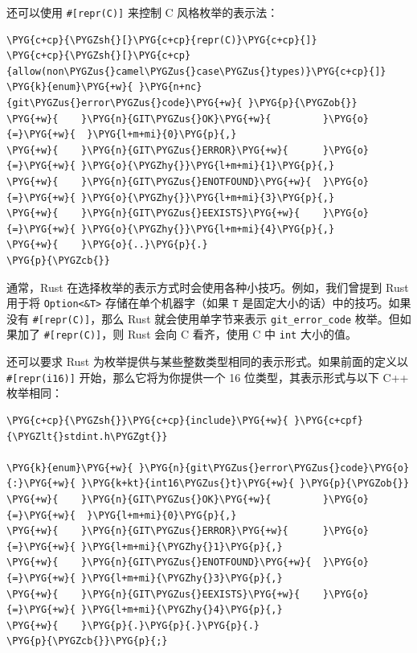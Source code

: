 还可以使用 \texttt{\#[repr(C)]} 来控制 C 风格枚举的表示法：

\begin{Verbatim}[commandchars=\\\{\},breaklines=true,breakanywhere=true,fontsize=\codefont,xleftmargin=17bp]
\PYG{c+cp}{\PYGZsh{}[}\PYG{c+cp}{repr(C)}\PYG{c+cp}{]}
\PYG{c+cp}{\PYGZsh{}[}\PYG{c+cp}{allow(non\PYGZus{}camel\PYGZus{}case\PYGZus{}types)}\PYG{c+cp}{]}
\PYG{k}{enum}\PYG{+w}{ }\PYG{n+nc}{git\PYGZus{}error\PYGZus{}code}\PYG{+w}{ }\PYG{p}{\PYGZob{}}
\PYG{+w}{    }\PYG{n}{GIT\PYGZus{}OK}\PYG{+w}{         }\PYG{o}{=}\PYG{+w}{  }\PYG{l+m+mi}{0}\PYG{p}{,}
\PYG{+w}{    }\PYG{n}{GIT\PYGZus{}ERROR}\PYG{+w}{      }\PYG{o}{=}\PYG{+w}{ }\PYG{o}{\PYGZhy{}}\PYG{l+m+mi}{1}\PYG{p}{,}
\PYG{+w}{    }\PYG{n}{GIT\PYGZus{}ENOTFOUND}\PYG{+w}{  }\PYG{o}{=}\PYG{+w}{ }\PYG{o}{\PYGZhy{}}\PYG{l+m+mi}{3}\PYG{p}{,}
\PYG{+w}{    }\PYG{n}{GIT\PYGZus{}EEXISTS}\PYG{+w}{    }\PYG{o}{=}\PYG{+w}{ }\PYG{o}{\PYGZhy{}}\PYG{l+m+mi}{4}\PYG{p}{,}
\PYG{+w}{    }\PYG{o}{..}\PYG{p}{.}
\PYG{p}{\PYGZcb{}}
\end{Verbatim}

通常，Rust 在选择枚举的表示方式时会使用各种小技巧。例如，我们曾提到 Rust 用于将 \texttt{Option<\&T>} 存储在单个机器字（如果 \texttt{T} 是固定大小的话）中的技巧。如果没有 \texttt{\#[repr(C)]}，那么 Rust 就会使用单字节来表示 \texttt{git\_error\_code} 枚举。但如果加了 \texttt{\#[repr(C)]}，则 Rust 会向 C 看齐，使用 C 中 \texttt{int} 大小的值。

还可以要求 Rust 为枚举提供与某些整数类型相同的表示形式。如果前面的定义以 \texttt{\#[repr(i16)]} 开始，那么它将为你提供一个 16 位类型，其表示形式与以下 C++ 枚举相同：

\begin{Verbatim}[commandchars=\\\{\},breaklines=true,breakanywhere=true,fontsize=\codefont,xleftmargin=17bp]
\PYG{c+cp}{\PYGZsh{}}\PYG{c+cp}{include}\PYG{+w}{ }\PYG{c+cpf}{\PYGZlt{}stdint.h\PYGZgt{}}

\PYG{k}{enum}\PYG{+w}{ }\PYG{n}{git\PYGZus{}error\PYGZus{}code}\PYG{o}{:}\PYG{+w}{ }\PYG{k+kt}{int16\PYGZus{}t}\PYG{+w}{ }\PYG{p}{\PYGZob{}}
\PYG{+w}{    }\PYG{n}{GIT\PYGZus{}OK}\PYG{+w}{         }\PYG{o}{=}\PYG{+w}{  }\PYG{l+m+mi}{0}\PYG{p}{,}
\PYG{+w}{    }\PYG{n}{GIT\PYGZus{}ERROR}\PYG{+w}{      }\PYG{o}{=}\PYG{+w}{ }\PYG{l+m+mi}{\PYGZhy{}1}\PYG{p}{,}
\PYG{+w}{    }\PYG{n}{GIT\PYGZus{}ENOTFOUND}\PYG{+w}{  }\PYG{o}{=}\PYG{+w}{ }\PYG{l+m+mi}{\PYGZhy{}3}\PYG{p}{,}
\PYG{+w}{    }\PYG{n}{GIT\PYGZus{}EEXISTS}\PYG{+w}{    }\PYG{o}{=}\PYG{+w}{ }\PYG{l+m+mi}{\PYGZhy{}4}\PYG{p}{,}
\PYG{+w}{    }\PYG{p}{.}\PYG{p}{.}\PYG{p}{.}
\PYG{p}{\PYGZcb{}}\PYG{p}{;}
\end{Verbatim}

